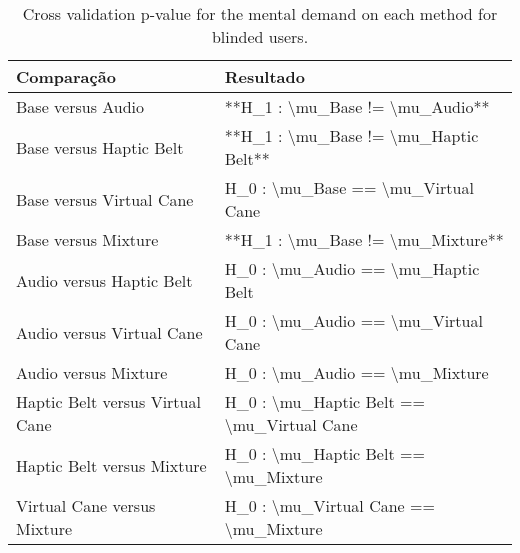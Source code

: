 
\begin{table}[!htb]
\centering
\caption{Cross validation p-value for the mental demand on each method for blinded users.}
\label{tab:lsd_mental_demand}
\begin{tabular}{ll}
\toprule
                     Comparação &                                 Resultado \\
\midrule
              Base versus Audio &           **H\_1 : \textbackslash mu\_Base != \textbackslash mu\_Audio** \\
        Base versus Haptic Belt &     **H\_1 : \textbackslash mu\_Base != \textbackslash mu\_Haptic Belt** \\
       Base versus Virtual Cane &        H\_0 : \textbackslash mu\_Base == \textbackslash mu\_Virtual Cane \\
            Base versus Mixture &         **H\_1 : \textbackslash mu\_Base != \textbackslash mu\_Mixture** \\
       Audio versus Haptic Belt &        H\_0 : \textbackslash mu\_Audio == \textbackslash mu\_Haptic Belt \\
      Audio versus Virtual Cane &       H\_0 : \textbackslash mu\_Audio == \textbackslash mu\_Virtual Cane \\
           Audio versus Mixture &            H\_0 : \textbackslash mu\_Audio == \textbackslash mu\_Mixture \\
Haptic Belt versus Virtual Cane & H\_0 : \textbackslash mu\_Haptic Belt == \textbackslash mu\_Virtual Cane \\
     Haptic Belt versus Mixture &      H\_0 : \textbackslash mu\_Haptic Belt == \textbackslash mu\_Mixture \\
    Virtual Cane versus Mixture &     H\_0 : \textbackslash mu\_Virtual Cane == \textbackslash mu\_Mixture \\
\bottomrule
\end{tabular}
\end{table}

